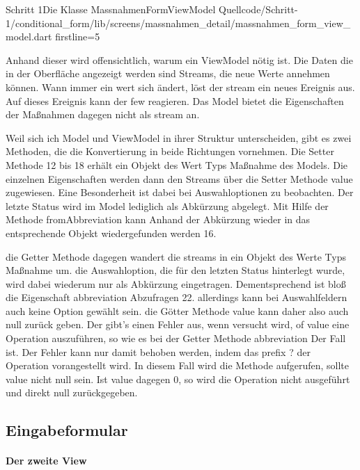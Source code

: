 {\begin{alexlisting}{Schritt 1}{Die Klasse MassnahmenFormViewModel}
  {Quellcode/Schritt-1/conditional_form/lib/screens/massnahmen_detail/massnahmen_form_view_model.dart}
  {firstline=5}
  \label{lst:Schritt1KlasseMassnahmenFormViewModel}
\end{alexlisting}

Anhand dieser wird offensichtlich, warum ein ViewModel nötig ist. Die Daten die in der Oberfläche angezeigt werden sind Streams, die neue Werte annehmen können. Wann immer ein wert sich ändert, löst der stream ein neues Ereignis aus. Auf dieses Ereignis kann der few reagieren. Das Model bietet die Eigenschaften der Maßnahmen dagegen nicht als stream an. 

Weil sich ich Model und ViewModel in ihrer Struktur unterscheiden, gibt es zwei Methoden, die die Konvertierung in beide Richtungen vornehmen. Die Setter Methode 12 bis 18 erhält  ein Objekt des Wert Typs Maßnahme des Models. Die einzelnen Eigenschaften werden dann den Streams über die Setter Methode value zugewiesen. Eine Besonderheit ist dabei bei Auswahloptionen zu beobachten. Der letzte Status wird im Model lediglich als Abkürzung abgelegt. Mit Hilfe der Methode fromAbbreviation kann Anhand der Abkürzung wieder in das entsprechende Objekt wiedergefunden werden 16. 

 die Getter Methode dagegen wandert die streams in ein Objekt  des Werte Typs Maßnahme um.  die Auswahloption, die für den letzten Status hinterlegt wurde, wird dabei wiederum nur als Abkürzung eingetragen. Dementsprechend ist bloß die Eigenschaft abbreviation Abzufragen 22.  allerdings kann bei Auswahlfeldern auch keine Option gewählt sein.  die Götter Methode value kann daher also auch null zurück geben.  Der gibt's einen Fehler aus,  wenn versucht wird, of value  eine Operation auszuführen, so wie es bei der Getter Methode abbreviation Der Fall ist. Der Fehler kann nur damit behoben werden, indem das  prefix ?  der Operation vorangestellt wird. In diesem Fall wird die Methode aufgerufen, sollte value  nicht null sein.  Ist value dagegen 0, so wird die Operation nicht ausgeführt und direkt null zurückgegeben. 


\clearpage
\subsection{Eingabeformular}
\paragraph{Der zweite View}

}
